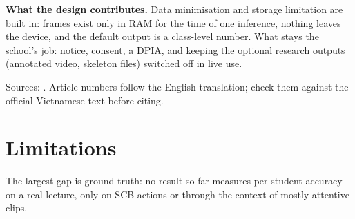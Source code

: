 \textbf{What the design contributes.} Data minimisation and storage limitation are built in: frames exist only in RAM for the time of one inference, nothing leaves the device, and the default output is a class-level number. What stays the school's job: notice, consent, a DPIA, and keeping the optional research outputs (annotated video, skeleton files) switched off in live use.

Sources: \cite{b12,b24,b25,b26,b27}. Article numbers follow the English translation; check them against the official Vietnamese text before citing.

\section{Limitations}

The largest gap is ground truth: no result so far measures per-student accuracy on a real lecture, only on SCB actions or through the context of mostly attentive clips.

